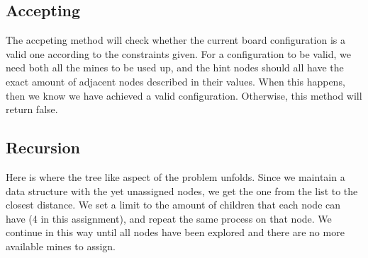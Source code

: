 \documentclass{article}
\begin{document}
\subsection{Accepting}
The accpeting method will check whether the current board configuration is a valid one according to the 
constraints given. For a configuration to be valid, we need both all the mines to be used up, and the hint nodes
should all have the exact amount of adjacent nodes described in their values. When this happens, then we know 
we have achieved a valid configuration. Otherwise, this method will return false.
\subsection{Recursion}
Here is where the tree like aspect of the problem unfolds. Since we maintain a data structure with the 
yet unassigned nodes, we get the one from the list to the closest distance. We set a limit to the amount
of children that each node can have (4 in this assignment), and repeat the same process on that node. 
We continue in this way until all nodes have been explored and there are no more available mines to assign.
\end{document}

